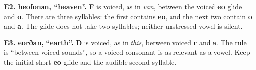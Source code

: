 \textbf{E2. heofonan, “heaven”.} \textbf{F} is voiced, as in \emph{van}, between the voiced \textbf{eo} glide and \textbf{o}. There are three syllables: the first contains \textbf{eo}, and the next two contain \textbf{o} and \textbf{a}. The glide does not take two syllables; neither unstressed vowel is silent.

\textbf{E3. eorðan, “earth”.} \textbf{Ð} is voiced, as in \emph{this}, between voiced \textbf{r} and \textbf{a}. The rule is “between voiced sounds”, so a voiced consonant is as relevant as a vowel. Keep the initial short \textbf{eo} glide and the audible second syllable.


